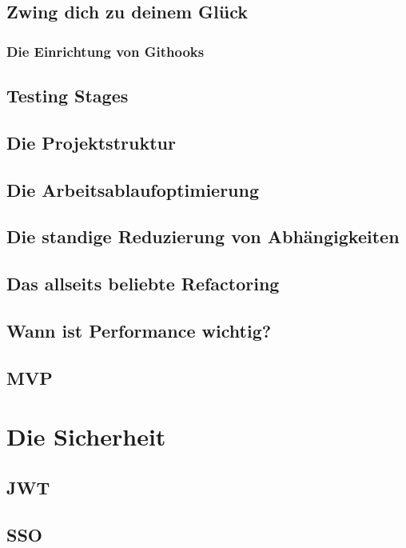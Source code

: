 \section{Zwing dich zu deinem Glück}

\subsection{Die Einrichtung von Githooks}
\section{Testing Stages}

\section{Die Projektstruktur}

\section{Die Arbeitsablaufoptimierung}

\section{Die standige Reduzierung von Abhängigkeiten}

\section{Das allseits beliebte Refactoring}

\section{Wann ist Performance wichtig?}

\section{MVP}

\chapter{Die Sicherheit}
\section{JWT}
\section{SSO}
